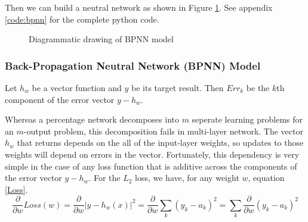 \documentclass{mcmthesis}
\begin{document}
Then we can build a neutral network as shown in Figure \ref{fig:BPNN}. See appendix \ref{code:bpnn} for the complete python code. 
\begin{figure}[H]
    \centering
    \caption{Diagrammatic drawing of BPNN model}
    \label{fig:BPNN}
\end{figure}


\subsubsection{Back-Propagation Neutral Network (BPNN) Model} \label{Sec:BPNN} 
	
	
	Let $h_{w}$ be a vector function and $y$ be its target result. Then $Err_{k}$ be the $k$th component of the error vector $y-h_{w}$.
	
	Whereas a percentage network decomposes into $m$ seperate learning problems for an $m$-output problem, this decomposition fails in multi-layer network. The vector $h_{w}$ that returns depends on the all of the input-layer weights, so updates to those weights will depend on errors in the vector. Fortunately, this dependency is very simple in the case of any loss function that is additive across the components of the error vector $y-h_{w}$. For the $L_{2}$ loss, we have, for any weight $w$,  equation \ref{Loss}.
	\begin{equation}
	\label{Loss}
	   \frac{\partial }{\partial w}Loss\left ( w \right )=\frac{\partial }{\partial w}\left | y-h_{w}\left ( x \right ) \right |^{2}
   =\frac{\partial }{\partial w}\sum_{k}\left ( y_{k}-a_{k} \right )^{2}=\sum_{k}\frac{\partial }{\partial w}\left ( y_{k}-a_{k} \right )^{2} 
	\end{equation}
\end{document}
